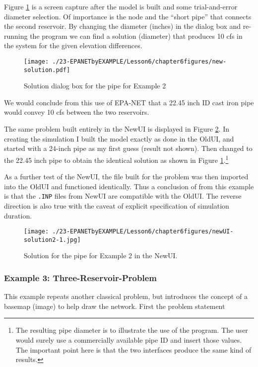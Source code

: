 Figure \ref{fig:new-solution} is a screen capture after the model is built and some trial-and-error diameter selection.   Of importance is the node and the ``short pipe'' that connects the second reservoir.   By changing the diameter (inches) in the dialog box and re-running the program we can find a solution (diameter) that produces 10 cfs in the system for the given elevation differences.  

\begin{figure}[h!] %
   \centering
   \texttt{[image: ./23-EPANETbyEXAMPLE/Lesson6/chapter6figures/new-solution.pdf]} 
   \caption{Solution dialog box for the pipe for Example 2}
   \label{fig:new-solution}
\end{figure}

We would conclude from this use of EPA-NET that a 22.45 inch ID cast iron pipe would convey 10 cfs between the two reservoirs. 

The same problem built entirely in the NewUI is displayed in Figure \ref{fig:new-solution2-1}.  
In creating the simulation I built the model exactly as done in the OldUI, and started with a 24-inch pipe as my first guess (result not shown).   Then changed to the 22.45 inch pipe to obtain the identical solution as shown in Figure \ref{fig:new-solution}.\footnote{The resulting pipe diameter is to illustrate the use of the program.  The user would surely use a commercially available pipe ID and insert those values.  The important point here is that the two interfaces produce the same kind of results.}

\newpage As a further test of the NewUI, the file built for the problem was then imported into the OldUI and functioned identically.  
Thus a conclusion of from this example is that the \texttt{.INP} files from NewUI are compatible with the OldUI.   
The reverse direction is also true with the caveat of explicit specification of simulation duration.

\begin{figure}[h!] %
   \centering
   \texttt{[image: ./23-EPANETbyEXAMPLE/Lesson6/chapter6figures/newUI-solution2-1.jpg]} 
   \caption{Solution for the pipe for Example 2 in the NewUI.}
   \label{fig:new-solution2-1}
\end{figure}
\clearpage

\subsubsection{Example 3: Three-Reservoir-Problem}
This example repeats another classical problem, but introduces the concept of a basemap (image) to help draw the network. 
First the problem statement

